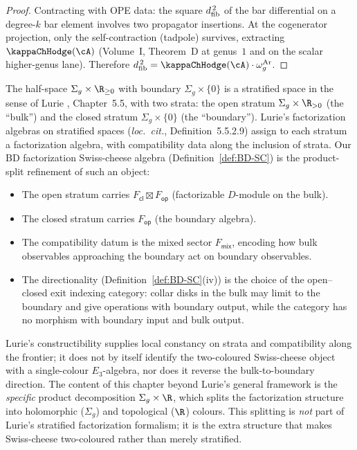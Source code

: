 \begin{proof}
Contracting with OPE data: the square $d_{\mathrm{fib}}^{\,2}$ of the
bar differential on a degree-$k$ bar element involves two
propagator insertions. At the cogenerator projection, only
the self-contraction (tadpole) survives, extracting
$\kappaChHodge(\cA)$ \textup{(}Volume~I, Theorem~D at genus~$1$ and on the
scalar higher-genus lane\textup{)}. Therefore
$\dfib^{\,2} = \kappaChHodge(\cA) \cdot \omega_g^{\mathrm{Ar}}$.
\end{proof}

\begin{remark}
\label{rem:lurie-comparison}
The half-space $\Sigma_g \times \R_{\geq 0}$ with boundary
$\Sigma_g \times \{0\}$ is a stratified space in the sense of
Lurie \cite{HA}, Chapter~5.5, with two strata: the open stratum
$\Sigma_g \times \R_{>0}$ (the ``bulk'') and the closed stratum
$\Sigma_g \times \{0\}$ (the ``boundary''). Lurie's
factorization algebras on stratified spaces
(\emph{loc.\ cit.}, Definition~5.5.2.9) assign to each stratum
a factorization algebra, with compatibility data along the
inclusion of strata. Our BD factorization Swiss-cheese algebra
(Definition~\ref{def:BD-SC}) is the product-split refinement of such
an object:
\begin{itemize}
\item The open stratum carries $F_{\mathsf{cl}} \boxtimes
 F_{\mathsf{op}}$ (factorizable $D$-module on the bulk).
\item The closed stratum carries $F_{\mathsf{op}}$ (the boundary
 algebra).
\item The compatibility datum is the mixed sector
 $F_{\mathsf{mix}}$, encoding how bulk observables approaching the
 boundary act on boundary observables.
\item The directionality (Definition~\ref{def:BD-SC}(iv)) is the
 choice of the open--closed exit indexing category: collar disks in
 the bulk may limit to the boundary and give operations with boundary
 output, while the category has no morphism with boundary input and
 bulk output.
\end{itemize}
Lurie's constructibility supplies local constancy on strata and
compatibility along the frontier; it does not by itself identify the
two-coloured Swiss-cheese object with a single-colour $E_3$-algebra,
nor does it reverse the bulk-to-boundary direction. The content of
this chapter beyond Lurie's general framework is the \emph{specific}
product decomposition
$\Sigma_g \times \R$, which splits the factorization structure
into holomorphic ($\Sigma_g$) and topological ($\R$) colours.
This splitting is \emph{not} part of Lurie's stratified
factorization formalism; it is the extra structure that makes
Swiss-cheese two-coloured rather than merely stratified.
\end{remark}


